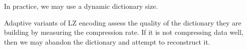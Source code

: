 \begin{enumerate}[label=(\alph*)]
    In practice, we may use a dynamic dictionary size.

    Adaptive variants of LZ encoding assess the quality of the dictionary they are building by measuring the compression rate. If it is not compressing data well, then we may abandon the dictionary and attempt to reconstruct it.



        
\end{enumerate}

